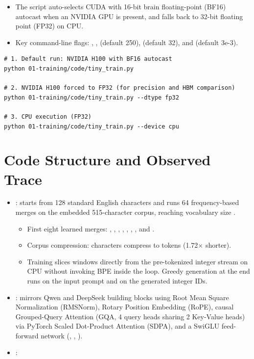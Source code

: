 \begin{itemize}
    \item The script auto-selects CUDA with 16-bit brain floating-point (BF16) autocast when an NVIDIA GPU is present, and falls back to 32-bit floating point (FP32) on CPU.
    \item Key command-line flags: , ,  (default 250),  (default 32), and  (default 3e-3).
\end{itemize}

\noindent\begin{minipage}{\linewidth}
\begin{lstlisting}
# 1. Default run: NVIDIA H100 with BF16 autocast
python 01-training/code/tiny_train.py

# 2. NVIDIA H100 forced to FP32 (for precision and HBM comparison)
python 01-training/code/tiny_train.py --dtype fp32

# 3. CPU execution (FP32)
python 01-training/code/tiny_train.py --device cpu
\end{lstlisting}
\end{minipage}

\section{Code Structure and Observed Trace}

\begin{itemize}
    \item {}: starts from 128 standard English characters and runs 64 frequency-based merges on the embedded 515-character corpus, reaching vocabulary size .
    \begin{itemize}
        \item First eight learned merges: , , , , , , , and .
        \item Corpus compression:  characters compress to  tokens (1.72$\times$ shorter).
        \item Training slices \shape{[B, T]} windows directly from the pre-tokenized integer stream on CPU without invoking BPE inside the loop. Greedy generation at the end runs  on the input prompt and  on the generated integer IDs.
    \end{itemize}
    \item {}: mirrors Qwen and DeepSeek building blocks using Root Mean Square Normalization (RMSNorm), Rotary Position Embedding (RoPE), causal Grouped-Query Attention (GQA, 4 query heads sharing 2 Key-Value heads) via PyTorch Scaled Dot-Product Attention (SDPA), and a SwiGLU feed-forward network (, , ).
    \item {}:
\end{itemize}

